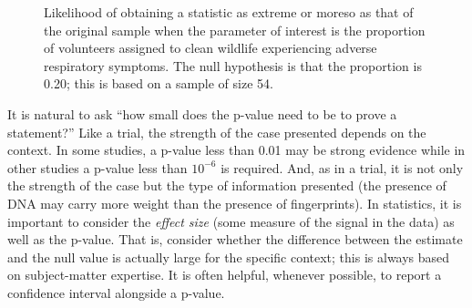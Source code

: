 \documentclass[
  letterpaper,
  DIV=11,
  numbers=noendperiod]{scrreprt}
\theoremstyle{plain}
\theoremstyle{definition}
\theoremstyle{definition}
\theoremstyle{remark}
\begin{document}
\begin{figure}


\caption{\label{fig-nulldistns-deepwater-pvalue}Likelihood of obtaining
a statistic as extreme or moreso as that of the original sample when the
parameter of interest is the proportion of volunteers assigned to clean
wildlife experiencing adverse respiratory symptoms. The null hypothesis
is that the proportion is 0.20; this is based on a sample of size 54.}

\end{figure}%

It is natural to ask ``how small does the p-value need to be to prove a
statement?'' Like a trial, the strength of the case presented depends on
the context. In some studies, a p-value less than 0.01 may be strong
evidence while in other studies a p-value less than \(10^{-6}\) is
required. And, as in a trial, it is not only the strength of the case
but the type of information presented (the presence of DNA may carry
more weight than the presence of fingerprints). In statistics, it is
important to consider the \emph{effect size} (some measure of the signal
in the data) as well as the p-value. That is, consider whether the
difference between the estimate and the null value is actually large for
the specific context; this is always based on subject-matter expertise.
It is often helpful, whenever possible, to report a confidence interval
alongside a p-value.
\end{document}
